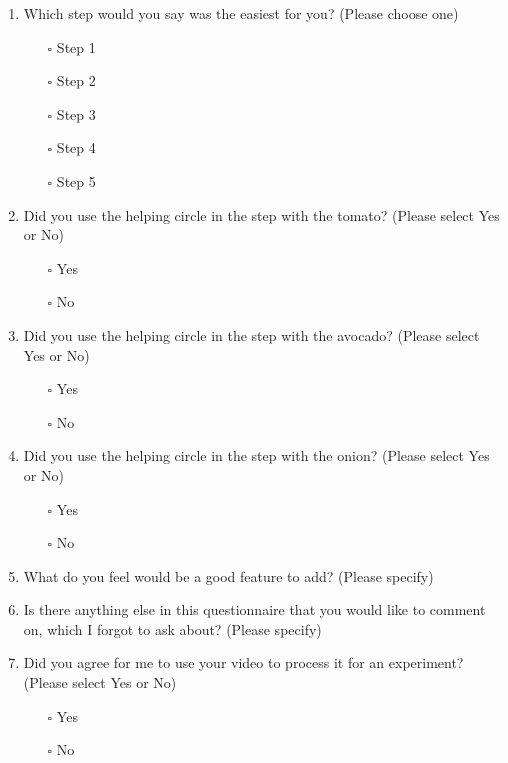 \begin{enumerate}
    \item Which step would you say was the easiest for you? (Please choose one)\\
    \begin{itemize}
        \item[$\square$] Step 1
        \item[$\square$] Step 2
        \item[$\square$] Step 3
        \item[$\square$] Step 4
        \item[$\square$] Step 5
    \end{itemize}
    
    \item Did you use the helping circle in the step with the tomato? (Please select Yes or No)\\
    \begin{itemize}
        \item[$\square$] Yes
        \item[$\square$] No
    \end{itemize}
    
    \item Did you use the helping circle in the step with the avocado? (Please select Yes or No)\\
    \begin{itemize}
        \item[$\square$] Yes
        \item[$\square$] No
    \end{itemize}
    
    \item Did you use the helping circle in the step with the onion? (Please select Yes or No)\\
    \begin{itemize}
        \item[$\square$] Yes
        \item[$\square$] No
    \end{itemize}
    
    \item What do you feel would be a good feature to add? (Please specify)
    
    \item Is there anything else in this questionnaire that you would like to comment on, which I forgot to ask about? (Please specify)
    
    \item Did you agree for me to use your video to process it for an experiment? (Please select Yes or No)\\
    \begin{itemize}
        \item[$\square$] Yes
        \item[$\square$] No
    \end{itemize}
\end{enumerate}
